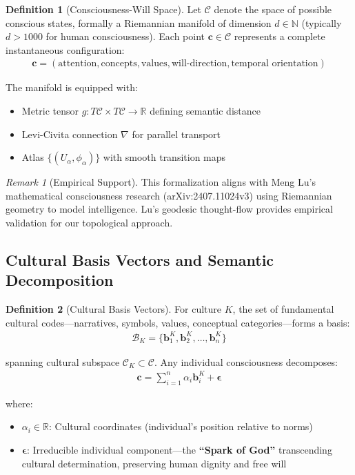 \documentclass[11pt,a4paper]{article}
\theoremstyle{definition}
\newtheorem{definition}{Definition}[section]
\theoremstyle{remark}
\newtheorem{remark}{Remark}[section]
\newcommand{\RR}{\mathbb{R}}
\newcommand{\CC}{\mathcal{C}}
\newcommand{\bb}{\mathbf{b}}
\newcommand{\cc}{\mathbf{c}}
\begin{document}
\begin{definition}[Consciousness-Will Space]
Let \(\CC\) denote the space of possible conscious states, formally a Riemannian manifold of dimension \(d \in \mathbb{N}\) (typically \(d > 1000\) for human consciousness). Each point \(\cc \in \CC\) represents a complete instantaneous configuration:
\begin{align}
\cc = (\text{attention}, \text{concepts}, \text{values}, \text{will-direction}, \text{temporal orientation})
\end{align}

The manifold is equipped with:
\begin{itemize}
\item Metric tensor \(g: T\CC \times T\CC \rightarrow \RR\) defining semantic distance
\item Levi-Civita connection \(\nabla\) for parallel transport
\item Atlas \(\{(U_\alpha, \phi_\alpha)\}\) with smooth transition maps
\end{itemize}
\end{definition}

\begin{remark}[Empirical Support]
This formalization aligns with Meng Lu's mathematical consciousness research (arXiv:2407.11024v3) using Riemannian geometry to model intelligence. Lu's geodesic thought-flow provides empirical validation for our topological approach.
\end{remark}

\subsection{Cultural Basis Vectors and Semantic Decomposition}

\begin{definition}[Cultural Basis Vectors]
For culture \(K\), the set of fundamental cultural codes—narratives, symbols, values, conceptual categories—forms a basis:
\begin{align}
\mathcal{B}_K = \{\bb_1^K, \bb_2^K, \ldots, \bb_n^K\}
\end{align}

spanning cultural subspace \(\CC_K \subset \CC\). Any individual consciousness decomposes:
\begin{align}
\cc = \sum_{i=1}^n \alpha_i \bb_i^K + \boldsymbol{\epsilon}
\end{align}

where:
\begin{itemize}
\item \(\alpha_i \in \RR\): Cultural coordinates (individual's position relative to norms)
\item \(\boldsymbol{\epsilon}\): Irreducible individual component—the \textbf{``Spark of God''} transcending cultural determination, preserving human dignity and free will
\end{itemize}
\end{definition}
\end{document}
